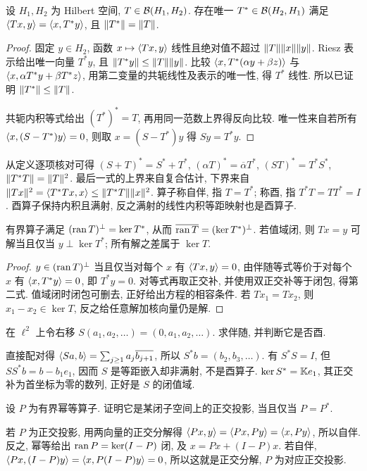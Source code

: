 \begin{theorem}\label{thm:adjoint}
设 $H_1,H_2$ 为 Hilbert 空间, $T\in\mathcal B(H_1,H_2)$. 存在唯一 $T^*\in\mathcal B(H_2,H_1)$ 满足 $\langle Tx,y\rangle=\langle x,T^*y\rangle$, 且 $\lVert T^*\rVert=\lVert T\rVert$.
\end{theorem}
\begin{proof}
固定 $y\in H_2$, 函数 $x\mapsto\langle Tx,y\rangle$ 线性且绝对值不超过 $\lVert T\rVert\lVert x\rVert\lVert y\rVert$. Riesz 表示给出唯一向量 $T^*y$, 且 $\lVert T^*y\rVert\le\lVert T\rVert\lVert y\rVert$. 比较 $\langle x,T^*(\alpha y+\beta z)\rangle$ 与 $\langle x,\alpha T^*y+\beta T^*z\rangle$, 用第二变量的共轭线性及表示的唯一性, 得 $T^*$ 线性. 所以已证明 $\lVert T^*\rVert\le\lVert T\rVert$.

共轭内积等式给出 $(T^*)^*=T$, 再用同一范数上界得反向比较. 唯一性来自若所有 $\langle x,(S-T^*)y\rangle=0$, 则取 $x=(S-T^*)y$ 得 $Sy=T^*y$.
\end{proof}
从定义逐项核对可得 $(S+T)^*=S^*+T^*$, $(\alpha T)^*=\overline\alpha T^*$, $(ST)^*=T^*S^*$, $\lVert T^*T\rVert=\lVert T\rVert^2$. 最后一式的上界来自复合估计, 下界来自 $\lVert Tx\rVert^2=\langle T^*Tx,x\rangle\le\lVert T^*T\rVert\lVert x\rVert^2$. 算子称自伴, 指 $T=T^*$; 称酉, 指 $T^*T=TT^*=I$. 酉算子保持内积且满射, 反之满射的线性内积等距映射也是酉算子.

\begin{theorem}\label{thm:rangeperp}
有界算子满足 $(\operatorname{ran} T)^\perp=\ker T^*$, 从而 $\overline{\operatorname{ran} T}=(\ker T^*)^\perp$. 若值域闭, 则 $Tx=y$ 可解当且仅当 $y\perp\ker T^*$; 所有解之差属于 $\ker T$.
\end{theorem}
\begin{proof}
$y\in(\operatorname{ran} T)^\perp$ 当且仅当对每个 $x$ 有 $\langle Tx,y\rangle=0$, 由伴随等式等价于对每个 $x$ 有 $\langle x,T^*y\rangle=0$, 即 $T^*y=0$. 对等式再取正交补, 并使用双正交补等于闭包, 得第二式. 值域闭时闭包可删去, 正好给出方程的相容条件. 若 $Tx_1=Tx_2$, 则 $x_1-x_2\in\ker T$, 反之给任意解加核向量仍是解.
\end{proof}

\begin{example}\label{legacy:ch07:example1}
在 $\ell^2$ 上令右移 $S(a_1,a_2,\ldots)=(0,a_1,a_2,\ldots)$. 求伴随, 并判断它是否酉.
\end{example}
\begin{solution}
直接配对得 $\langle Sa,b\rangle=\sum_{j\ge1}a_j\overline{b_{j+1}}$, 所以 $S^*b=(b_2,b_3,\ldots)$. 有 $S^*S=I$, 但 $SS^*b=b-b_1e_1$, 因而 $S$ 是等距嵌入却非满射, 不是酉算子. $\ker S^*=\mathbb K e_1$, 其正交补为首坐标为零的数列, 正好是 $S$ 的闭值域.
\end{solution}

\begin{exercise}\label{legacy:ch07:exercise1}
设 $P$ 为有界幂等算子. 证明它是某闭子空间上的正交投影, 当且仅当 $P=P^*$.
\end{exercise}
\begin{solution}
若 $P$ 为正交投影, 用两向量的正交分解得 $\langle Px,y\rangle=\langle Px,Py\rangle=\langle x,Py\rangle$, 所以自伴. 反之, 幂等给出 $\operatorname{ran} P=\ker(I-P)$ 闭, 及 $x=Px+(I-P)x$. 若自伴, $\langle Px,(I-P)y\rangle=\langle x,P(I-P)y\rangle=0$, 所以这就是正交分解, $P$ 为对应正交投影.
\end{solution}

